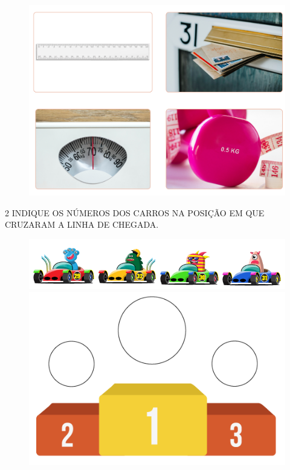 \begin{figure}[H]
\centering
\includegraphics[width=.6\textwidth]{./media/SAEB_1ANO_MAT_FIGURA2.png}
\end{figure}


\num{2} INDIQUE OS NÚMEROS DOS CARROS NA POSIÇÃO EM QUE CRUZARAM A LINHA DE CHEGADA.


\begin{figure}[H]
\includegraphics[width=\textwidth]{./media/SAEB_1ANO_MAT_FIGURA3.png}

\centering
\includegraphics[width=.5\textwidth]{./media/SAEB_1ANO_MAT_FIGURA3a.png}
\end{figure}


